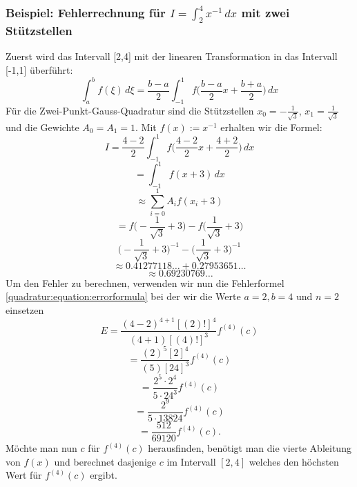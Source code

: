 \subsubsection{Beispiel: Fehlerrechnung für $I = \int_{2}^{4}x^{-1}\,dx$ mit zwei Stützstellen}
Zuerst wird das Intervall [2,4] mit der linearen Transformation in das Intervall [-1,1] überführt:
\begin{equation}
    \int_{a}^{b} f(\xi)\,d\xi = \frac{b-a}{2}\int_{-1}^{1} f \bigg( \frac{b-a}{2} x + \frac{b+a}{2} \bigg) \,dx
\end{equation}
Für die Zwei-Punkt-Gauss-Quadratur sind die Stützstellen 
$x_{0}= -\frac{1}{\sqrt{3}}$, $x_{1} = \frac{1}{\sqrt{3}}$ 
und die Gewichte $A_{0} = A_{1} = 1$. Mit $f(x) := x^{-1}$ 
erhalten wir die Formel:
\begin{equation*}
    I = \frac{4-2}{2} \int_{-1}^{1} f \bigg( \frac{4-2}{2} x + \frac{4+2}{2} \bigg) \,dx
\end{equation*}
\begin{equation*}
    = \int_{-1}^{1} f (x + 3)\,dx 
\end{equation*}
\begin{equation*}
    \approx \sum_{i=0}^{1} A_{i} f(x_{i} + 3)
\end{equation*}
\begin{equation*}
    = f\bigg(-\frac{1}{\sqrt{3}}+3\bigg)
    -
    f\bigg(\frac{1}{\sqrt{3}}+3\bigg)
\end{equation*}
\begin{equation}
    \bigg(-\frac{1}{\sqrt{3}}+3\bigg)^{-1} 
    - 
    \bigg(\frac{1}{\sqrt{3}}+3\bigg)^{-1}
\end{equation}
\begin{equation*}
    \approx 0.41277118\dots + 0.27953651\dots
\end{equation*}
\begin{equation}
    \approx 0.69230769\dots
\end{equation}
Um den Fehler zu berechnen, verwenden wir nun die Fehlerformel \ref{quadratur:equation:errorformula}
bei der wir die Werte $a = 2, b = 4$ und $n = 2$ einsetzen
\begin{equation*}
    E = \frac{(4-2)^{4+1}[(2)!]^{4}}{(4+1)[(4)!]^{3}}f^{(4)}(c)
\end{equation*}
\begin{equation*}
    = \frac{(2)^{5}[2]^{4}}{(5)[24]^{3}}f^{(4)}(c)
\end{equation*}
\begin{equation*}
    = \frac{2^{5} \cdot 2^{4}}{5 \cdot 24^{3}}f^{(4)}(c)
\end{equation*}
\begin{equation*}
    = \frac{2^{9} }{5 \cdot 13824}f^{(4)}(c)
\end{equation*}
\begin{equation}
    = \frac{512}{69120}f^{(4)}(c).
\end{equation}
Möchte man nun $c$ für $f^{(4)}(c)$ herausfinden, benötigt man die 
vierte Ableitung von $f(x)$ und berechnet dasjenige $c$ im Intervall $[2, 4]$ 
welches den höchsten Wert für $f^{(4)}(c)$ ergibt.

